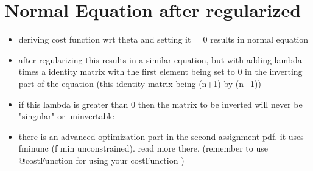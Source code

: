 \documentclass[]{article}
\begin{document}
\section{Normal Equation after regularized}
	\begin{itemize}
		\item deriving cost function wrt theta and setting it = 0 results in normal equation
		\item after regularizing this results in a similar equation, but with adding lambda times a identity matrix with the first element being set to 0 in the inverting part of the equation (this identity matrix being (n+1) by (n+1))
		\item if this lambda is greater than 0 then the matrix to be inverted will never be "singular" or uninvertable
		\item there is an advanced optimization part in the second assignment pdf. it uses fminunc (f min unconstrained). read more there. (remember to use @costFunction for using your costFunction )
	\end{itemize}
	
\end{document}
